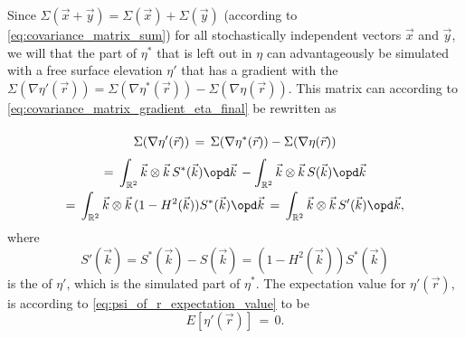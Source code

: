 Since $\Sigma(\vec{x}+\vec{y}) = \Sigma(\vec{x})+\Sigma(\vec{y})$ (according to \eqref{eq:covariance_matrix_sum}) for all stochastically independent vectors $\vec{x}$ and $\vec{y}$, we will \assume that the part of $\eta^*$ that is left out in $\eta$ can advantageously be simulated with a free surface elevation $\eta'$ that has a gradient with the  $\Sigma(\nabla\eta'(\vec{r})) = \Sigma(\nabla\eta^*(\vec{r})) - \Sigma(\nabla\eta(\vec{r}))$. This matrix can according to  \eqref{eq:covariance_matrix_gradient_eta_final} be rewritten as
%
\begin{equation}
\renewcommand*{\arraystretch}{2}
\begin{array}{c}
\displaystyle \Sigma(\nabla\eta'(\vec{r})) \,=\, \Sigma(\nabla\eta^*(\vec{r})) - \Sigma(\nabla\eta(\vec{r})) \\
\displaystyle =\, \int_{\mathbb{R}^2}\vec{k}\otimes\vec{k}\,S^*(\vec{k})\opd\vec{k} \,- \int_{\mathbb{R}^2}\vec{k}\otimes\vec{k}\,S(\vec{k})\opd\vec{k} \\
\displaystyle =\, \int_{\mathbb{R}^2}\vec{k}\otimes\vec{k}\,(1-H^2(\vec{k}))S^*(\vec{k})\opd\vec{k} \,=\, \int_{\mathbb{R}^2}\vec{k}\otimes\vec{k}\,S'(\vec{k})\opd\vec{k},
\end{array}
\end{equation}
%
where
%
\begin{equation}
S'(\vec{k}) = S^*(\vec{k}) - S(\vec{k}) = (1-H^2(\vec{k}))S^*(\vec{k})
\end{equation}
%
is the  of $\eta'$, which is the simulated part of $\eta^*$. The expectation value for $\eta'(\vec{r})$, is according to \eqref{eq:psi_of_r_expectation_value} \assumed to be
%
\begin{equation}
E[\eta'(\vec{r})] \,=\, 0.
\end{equation}

